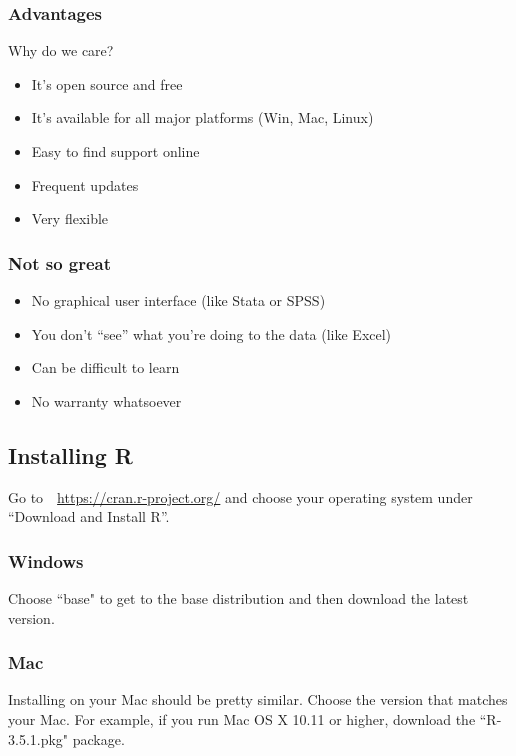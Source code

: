 \subsubsection*{Advantages}

Why do we care?
\begin{itemize}
\item It's open source and free
\item It's available for all major platforms (Win, Mac, Linux)
\item Easy to find support online
\item Frequent updates
\item Very flexible 

\end{itemize}

\subsubsection*{Not so great}

\begin{itemize}
\item No graphical user interface (like Stata or SPSS)
\item You don't ``see'' what you're doing to the data (like Excel)
\item Can be difficult to learn
\item No warranty whatsoever
\end{itemize}

\subsection{Installing R}

Go to\ \ {\small \url{https://cran.r-project.org/}} and choose your operating system under ``Download and Install R''.

\subsubsection*{Windows}

Choose ``base" to get to the base distribution and then download the latest version. 

\subsubsection*{Mac}

Installing \R on your Mac should be pretty similar. Choose the version that matches your Mac. For example, if you run Mac OS X 10.11 or higher, download the ``R-3.5.1.pkg" package.

